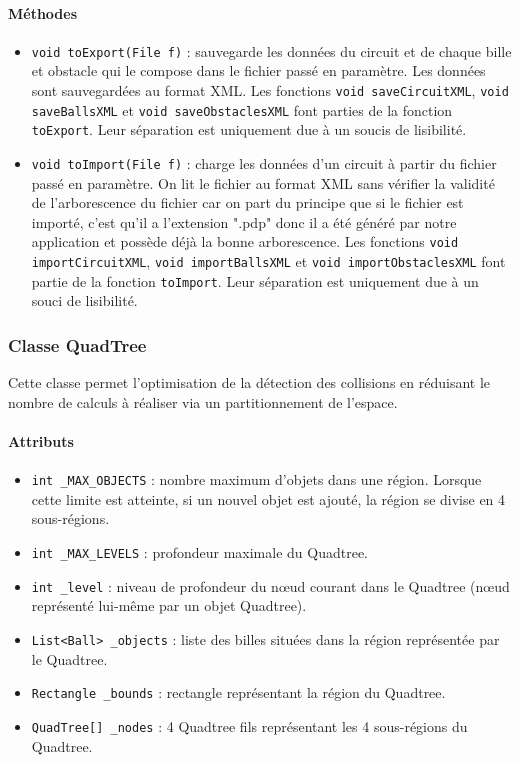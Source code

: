 \documentclass{report}
\begin{document}
\paragraph*{Méthodes}
\begin{itemize}
\item \texttt{void toExport(File f)} : sauvegarde les données du circuit et de chaque bille et obstacle qui le compose dans le fichier passé en paramètre. Les données sont sauvegardées au format XML. Les fonctions \texttt{void saveCircuitXML}, \texttt{void saveBallsXML} et \texttt{void saveObstaclesXML} font parties de la fonction \texttt{toExport}. Leur séparation est uniquement due à un soucis de lisibilité.
\item \texttt{void toImport(File f)} : charge les données d'un circuit à partir du fichier passé en paramètre. On lit le fichier au format XML sans vérifier la validité de l'arborescence du fichier car on part du principe que si le fichier est importé, c'est qu'il a l'extension ".pdp" donc il a été généré par notre application et possède déjà la bonne arborescence. Les fonctions \texttt{void importCircuitXML}, \texttt{void importBallsXML} et \texttt{void importObstaclesXML} font partie de la fonction \texttt{toImport}. Leur séparation est uniquement due à un souci de lisibilité.
\end{itemize}

\subsubsection{Classe QuadTree}

Cette classe permet l'optimisation de la détection des collisions en réduisant le nombre de calculs à réaliser via un partitionnement de l'espace.

\paragraph*{Attributs}
\begin{itemize}
\item \texttt{int \_MAX\_OBJECTS} : nombre maximum d'objets dans une région. Lorsque cette limite est atteinte, si un nouvel objet est ajouté, la région se divise en 4 sous-régions.
\item \texttt{int \_MAX\_LEVELS} : profondeur maximale du Quadtree.
\item \texttt{int \_level} : niveau de profondeur du nœud courant dans le Quadtree (nœud représenté lui-même par un objet Quadtree).
\item \texttt{List<Ball> \_objects} : liste des billes situées dans la région représentée par le Quadtree.
\item \texttt{Rectangle \_bounds} : rectangle représentant la région du Quadtree.
\item \texttt{QuadTree[] \_nodes} : 4 Quadtree fils représentant les 4 sous-régions du Quadtree.
\end{itemize}
\end{document}
